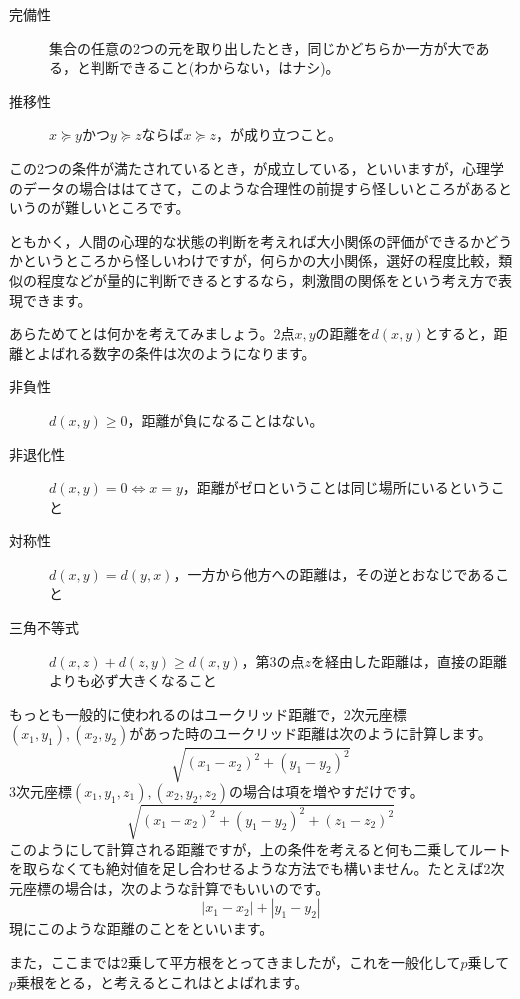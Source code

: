 \documentclass{ltjsbook}
\begin{document}
\begin{description}
    \item[完備性]集合の任意の2つの元を取り出したとき，同じかどちらか一方が大である，と判断できること(わからない，はナシ)。
    \item[推移性] $x \succeq y$かつ$y \succeq z$ならば$x \succeq z$，が成り立つこと。
\end{description}

この2つの条件が満たされているとき，が成立している，といいますが，心理学のデータの場合ははてさて，このような合理性の前提すら怪しいところがあるというのが難しいところです。

ともかく，人間の心理的な状態の判断を考えれば大小関係の評価ができるかどうかというところから怪しいわけですが，何らかの大小関係，選好の程度比較，類似の程度などが量的に判断できるとするなら，刺激間の関係をという考え方で表現できます。

あらためてとは何かを考えてみましょう。2点$x,y$の距離を$d(x,y)$とすると，距離とよばれる数字の条件は次のようになります。
\begin{description}
    \item[非負性] $d(x,y)\ge 0$，距離が負になることはない。
    \item[非退化性] $d(x,y)=0 \Leftrightarrow x=y$，距離がゼロということは同じ場所にいるということ
    \item[対称性] $d(x,y)=d(y,x)$，一方から他方への距離は，その逆とおなじであること
    \item[三角不等式] $d(x,z) + d(z,y) \ge d(x,y)$，第3の点$z$を経由した距離は，直接の距離よりも必ず大きくなること
\end{description}

もっとも一般的に使われるのはユークリッド距離で，2次元座標$(x_1,y_1),(x_2,y_2)$があった時のユークリッド距離は次のように計算します。
\[ \sqrt{(x_1-x_2)^2+(y_1-y_2)^2} \]
3次元座標$(x_1,y_1,z_1),(x_2,y_2,z_2)$の場合は項を増やすだけです。
\[ \sqrt{(x_1-x_2)^2+(y_1-y_2)^2+(z_1-z_2)^2} \]
このようにして計算される距離ですが，上の条件を考えると何も二乗してルートを取らなくても絶対値を足し合わせるような方法でも構いません。たとえば2次元座標の場合は，次のような計算でもいいのです。
\[ |x_1-x_2|+|y_1-y_2| \]
現にこのような距離のことをといいます。

また，ここまでは2乗して平方根をとってきましたが，これを一般化して$p$乗して$p$乗根をとる，と考えるとこれはとよばれます。
\end{document}
